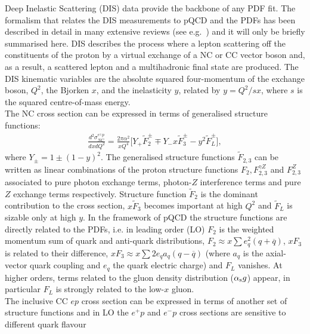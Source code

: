 Deep Inelastic Scattering (DIS) data provide the backbone of any PDF fit.
The formalism that relates the DIS measurements to pQCD and the PDFs has been described
in detail in many extensive reviews (see e.g.~\cite{disbook}) and it will only be briefly summarised here.
DIS describes the process where a lepton scattering off the constituents of the proton
by a virtual exchange of a NC 
or CC vector boson and, as a result, a scattered lepton and a 
multihadronic final state are produced.
The DIS kinematic variables are the absolute squared four-momentum of 
the exchange boson, $Q^2$, the Bjorken $x$, 
and the inelasticity $y$, related by $y=Q^2/sx$, where $s$ is the squared centre-of-mass energy.
\\
%
The NC cross section can be expressed in terms of generalised structure functions:
\begin{eqnarray}
   \frac{d^2\sigma_{NC}^{e^{\pm} p}}{dxdQ^2}=\frac{2\pi\alpha^2}{xQ^4} 
     \big [ Y_{+} \tilde F_2^{\pm} \mp Y_{-}x \tilde F_3^{\pm} - y^2 \tilde F_L^{\pm} \big ],
\end{eqnarray}
where $Y_{\pm} = 1 \pm (1-y)^2$. The generalised structure functions $\tilde F_{2,3}$ 
can be written as linear combinations of the proton structure functions $F_2, F_{2,3}^{\gamma Z}$ 
and $F_{2,3}^Z$ associated to pure photon exchange terms, photon-$Z$ interference
terms and pure $Z$ exchange terms respectively. 
Structure function $\tilde F_2$ is the dominant contribution to the cross section, 
$x \tilde F_3$ becomes important at high $Q^2$ and $\tilde F_L$ is sizable 
only at high $y$. 
In the framework of pQCD the structure functions are directly related to the 
PDFs, i.e. in leading order (LO)  $F_2$ is the weighted momentum sum of quark and anti-quark distributions, 
$F_2 \approx x \sum e^2_q (q+ \overline q)$, $xF_3$ is related to their difference, 
$xF_3 \approx x \sum 2e_q a_q (q- \overline q)$ (where $a_q$ is the axial-vector 
quark coupling and $e_q$ the quark electric charge) and $F_L$ vanishes. 
At higher orders, terms related to the gluon density distribution
($\alpha_\mathrm{s} g$) appear, in particular $F_L$ is strongly related to the low-$x$ 
gluon.
\\
The inclusive CC $ep$ cross section can be expressed 
in terms of another set of structure functions and in LO the $e^+p$ and $e^-p$ cross sections are sensitive to different quark flavour 
